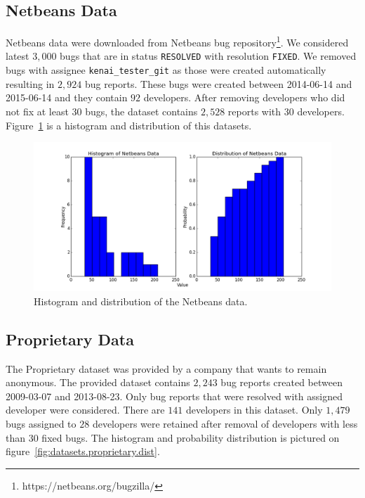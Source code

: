 \subsection{Netbeans Data}

Netbeans data were downloaded from Netbeans bug repository\footnote{https://netbeans.org/bugzilla/}. We considered latest $3,000$ bugs that are in status \texttt{RESOLVED} with resolution \texttt{FIXED}. We removed bugs with assignee \texttt{kenai\_tester\_git} as those were created automatically resulting in $2,924$ bug reports. These bugs were created between 2014-06-14 and 2015-06-14 and they contain $92$ developers. After removing developers who did not fix at least 30 bugs, the dataset contains $2,528$ reports with $30$ developers. Figure~\ref{fig:datasets.netbeans.dist} is a histogram and distribution of this datasets.

\begin{figure}[htbp]
    \centering
        \includegraphics[width=\textwidth]{./images/distribution/netbeans.png}
    \caption{Histogram and distribution of the Netbeans data.}
    \label{fig:datasets.netbeans.dist}
\end{figure}

\subsection{Proprietary Data}

The Proprietary dataset was provided by a company that wants to remain anonymous. The provided dataset contains $2,243$ bug reports created between 2009-03-07 and 2013-08-23. Only bug reports that were resolved with assigned developer were considered. There are $141$ developers in this dataset. Only $1,479$ bugs assigned to $28$ developers were retained after removal of developers with less than $30$ fixed bugs. The histogram and probability distribution is pictured on figure~\ref{fig:datasets.proprietary.dist}.

